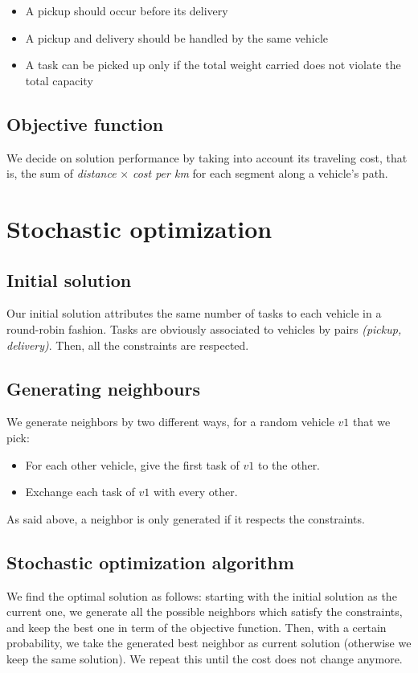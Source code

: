 \documentclass[11pt]{article}
\begin{document}
\begin{itemize}
	\item A pickup should occur before its delivery
	\item A pickup and delivery should be handled by the same vehicle
	\item A task can be picked up only if the total weight carried does not violate the total capacity
\end{itemize}

\subsection{Objective function}
We decide on solution performance by taking into account its traveling cost, that is, the sum of \textit{distance} $\times$ \textit{cost per km} for each segment along a vehicle's path. 


\section{Stochastic optimization}

\subsection{Initial solution}
Our initial solution attributes the same number of tasks to each vehicle in a round-robin fashion. Tasks are obviously associated to vehicles by pairs \textit{(pickup, delivery)}. Then, all the constraints are respected. 

\subsection{Generating neighbours}
We generate neighbors by two different ways, for a random vehicle $v1$ that we pick: 

\begin{itemize}
	\item For each other vehicle, give the first task of $v1$ to the other. 
	\item Exchange each task of $v1$ with every other. 
\end{itemize}

As said above, a neighbor is only generated if it respects the constraints.

\subsection{Stochastic optimization algorithm}
We find the optimal solution as follows: starting with the initial solution as the current one, we generate all the possible neighbors which satisfy the constraints, and keep the best one in term of the objective function. Then, with a certain probability, we take the generated best neighbor as current solution (otherwise we keep the same solution). We repeat this until the cost does not change anymore. 
\end{document}
